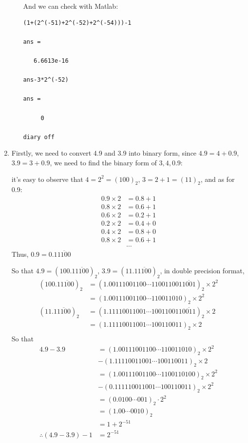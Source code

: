 \documentclass{article}
\begin{document}
\begin{enumerate}
\begin{enumerate}
And we can check with Matlab:

\begin{lstlisting}
(1+(2^(-51)+2^(-52)+2^(-54)))-1

ans =

   6.6613e-16

ans-3*2^(-52)

ans =

     0

diary off
\end{lstlisting}
\end{enumerate}
\item
Firstly, we need to convert 4.9 and 3.9 into binary form, since $4.9 = 4+ 0.9$, $3.9 = 3+ 0.9$, we need to find the binary form of $3,4,0.9$:

it's easy to observe that $4 = 2^2 = (100)_2$, $3 = 2+1=(11)_2$, and as for 0.9:\begin{align*}
0.9 \times 2 &= 0.8 +1\\
0.8 \times 2 &= 0.6 +1\\
0.6 \times 2 &= 0.2 +1\\
0.2 \times 2 &= 0.4 +0\\
0.4 \times 2 &= 0.8 +0\\
0.8 \times 2 &= 0.6 +1\\
&\cdots
\end{align*}
Thus, $0.9 = 0.1\overline{1100}$

So that $4.9 = (100.1\overline{1100})_2$, $3.9 = (11.1\overline{1100})_2$, in double precision format, \begin{align*}
(100.1\overline{1100})_2 &= (1.\boxed{00111001100\cdots 110011001}\overline{1001})_2 \times 2^2\\
&=(1.\boxed{00111001100\cdots 110011010})_2\times 2^2\\
(11.1\overline{1100})_2 &= (1.\boxed{11110011001\cdots 100110011}\overline{0011})_2 \times 2\\
&=(1.\boxed{11110011001\cdots 100110011})_2\times 2\\
\end{align*}
So that \begin{align*}
4.9 - 3.9 &=(1.\boxed{00111001100\cdots 110011010})_2\times 2^2\\
&-(1.\boxed{11110011001\cdots 100110011})_2\times 2\\
&=(1.\boxed{00111001100\cdots 110011010}0)_2\times 2^2\\
&-(0.\boxed{111110011001\cdots 10011001}1)_2\times 2^2\\
&=(0.\boxed{0100\cdots 00}1 )_2\cdot 2^2\\
&=(1.\boxed{00\cdots 0010})_2\\
&=1+2^{-51}\\
\therefore (4.9 - 3.9 ) -1 &= 2^{-51}
\end{align*}


\end{enumerate}
\end{document}

